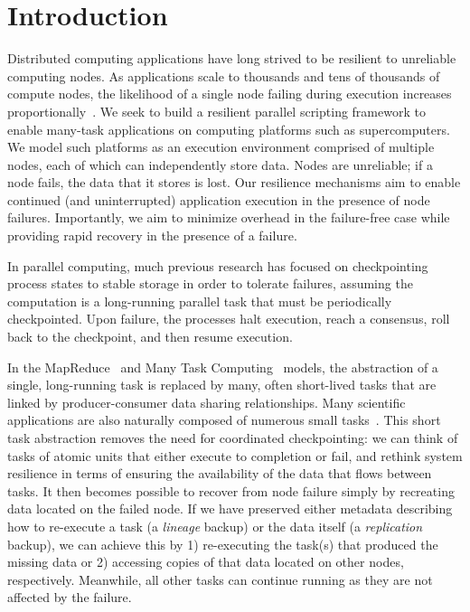 \documentclass{sig-alternate}
\newcommand{\katznote}[1]{ {\textcolor{blue}    { ***Dan:      #1 }}}
\newcommand{\zhaonote}[1]{{\textcolor{cyan}    { ***Zhao:      #1 }}}
\newcommand{\kylenote}[1]{{\textcolor{orange}    { ***Kyle:      #1 }}}
\newcommand{\katznote}[1]{}
\newcommand{\zhaonote}[1]{}
\newcommand{\kylenote}[1]{}
\begin{document}
\section{Introduction}
Distributed computing applications have long strived to %
be resilient to 
unreliable computing nodes. As applications scale to thousands and tens of thousands of 
compute nodes, the likelihood of a single node failing during execution increases proportionally~\cite{gfs2003, exaroadmap2011}. 
We seek to build a resilient parallel scripting framework to enable many-task applications on computing platforms such as supercomputers. We model such platforms as an execution 
environment comprised of multiple nodes, each of which can independently store data. Nodes are unreliable; if a node fails, the data that it stores is lost. 
Our resilience mechanisms aim to enable continued (and uninterrupted) application execution in the presence of node failures. 
Importantly, we aim to minimize overhead in the failure-free case while providing rapid recovery in the presence of a failure.

In parallel computing, much previous research has focused on checkpointing process states to stable storage in order to tolerate failures, assuming the computation is a long-running parallel task that must be periodically checkpointed. 
Upon failure, the processes halt execution, reach a consensus, roll back to the checkpoint, and then resume execution. 


In the MapReduce~\cite{mapreduce-04} and Many Task Computing~\cite{raicu08} models,
the abstraction of a single, long-running task is replaced by many, often short-lived tasks 
that are linked by producer-consumer data sharing relationships.
Many scientific applications are also naturally composed of numerous small tasks~\cite{FALKON-SC-08}. 
This short task abstraction removes the need for coordinated checkpointing: we can think of tasks of atomic units that either execute to completion
or fail, and rethink system resilience in terms of ensuring the availability of the data that flows between tasks.
It then becomes possible to recover from node failure simply by recreating data located on the failed node. 
If we have preserved either metadata describing how to re-execute a task (a {\em lineage} backup) or the data itself (a {\em replication} backup),
we can achieve this by 1) re-executing the task(s) that produced the missing data or 2) accessing copies of that data located on other nodes, respectively.
Meanwhile, all other tasks can continue running as they are not affected by the failure.
\end{document}

